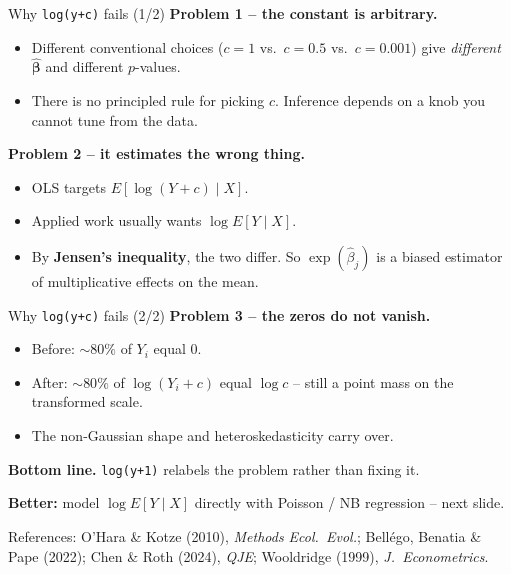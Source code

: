 \documentclass[10pt,ignorenonframetext,aspectratio=169]{beamer}
\begin{document}
\begin{frame}{Why \texttt{log(y+c)} fails (1/2)}
\textbf{Problem 1 -- the constant is arbitrary.}
\begin{itemize}
    \justifying
    \item Different conventional choices ($c = 1$ vs.\ $c = 0.5$ vs.\ $c = 0.001$) give \emph{different} $\hat{\boldsymbol{\beta}}$ and different $p$-values.
    \item There is no principled rule for picking $c$. Inference depends on a knob you cannot tune from the data.
\end{itemize}

\medskip
\textbf{Problem 2 -- it estimates the wrong thing.}
\begin{itemize}
    \justifying
    \item OLS targets $E\!\left[\log(Y+c) \mid X\right]$.
    \item Applied work usually wants $\log E[Y \mid X]$.
    \item By \textbf{Jensen's inequality}, the two differ. So $\exp(\hat{\beta}_j)$ is a \alert{biased} estimator of multiplicative effects on the mean.
\end{itemize}
\end{frame}


\begin{frame}{Why \texttt{log(y+c)} fails (2/2)}
\textbf{Problem 3 -- the zeros do not vanish.}
\begin{itemize}
    \justifying
    \item Before: $\sim 80\%$ of $Y_i$ equal $0$.
    \item After: $\sim 80\%$ of $\log(Y_i + c)$ equal $\log c$ -- still a point mass on the transformed scale.
    \item The non-Gaussian shape and heteroskedasticity carry over.
\end{itemize}

\medskip
\textbf{Bottom line.} \texttt{log(y+1)} relabels the problem rather than fixing it.

\medskip
\textbf{Better:} model $\log E[Y \mid X]$ directly with Poisson / NB regression -- next slide.

\medskip
\scriptsize References: O'Hara \& Kotze (2010), \textit{Methods Ecol.\ Evol.}; Bellégo, Benatia \& Pape (2022); Chen \& Roth (2024), \textit{QJE}; Wooldridge (1999), \textit{J.\ Econometrics}.
\end{frame}
\end{document}
